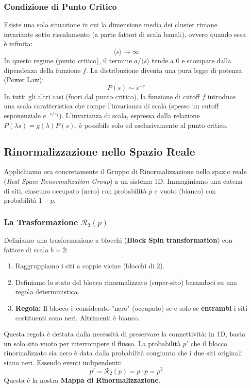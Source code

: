\subsubsection{Condizione di Punto Critico}
Esiste una sola situazione in cui la dimensione media dei cluster rimane invariante sotto riscalamento (a parte fattori di scala banali), ovvero quando essa è infinita:
\begin{equation}
    \langle s \rangle \to \infty
\end{equation}
In questo regime (punto critico), il termine $a/\langle s \rangle$ tende a 0 e scompare dalla dipendenza della funzione $f$. La distribuzione diventa una pura legge di potenza (Power Law):
\begin{equation}
    P(s) \sim s^{-\tau}
\end{equation}
In tutti gli altri casi (fuori dal punto critico), la funzione di cutoff $f$ introduce una scala caratteristica che rompe l'invarianza di scala (spesso un cutoff esponenziale $e^{-s/s_{\xi}}$).
L'invarianza di scala, espressa dalla relazione $P(\lambda s) = g(\lambda) P(s)$, è possibile solo ed esclusivamente al punto critico.

\subsection{Rinormalizzazione nello Spazio Reale}

Applichiamo ora concretamente il Gruppo di Rinormalizzazione nello spazio reale (\textit{Real Space Renormalization Group}) a un sistema 1D.
Immaginiamo una catena di siti, ciascuno occupato (nero) con probabilità $p$ e vuoto (bianco) con probabilità $1-p$.

\subsubsection{La Trasformazione $\mathcal{R}_2(p)$}
Definiamo una trasformazione a blocchi (\textbf{Block Spin transformation}) con fattore di scala $b=2$:
\begin{enumerate}
    \item Raggruppiamo i siti a coppie vicine (blocchi di 2).
    \item Definiamo lo stato del blocco rinormalizzato (super-sito) basandoci su una regola deterministica.
    \item \textbf{Regola:} Il blocco è considerato "nero" (occupato) se e solo se \textbf{entrambi} i siti costituenti sono neri. Altrimenti è bianco.
\end{enumerate}
Questa regola è dettata dalla necessità di preservare la connettività: in 1D, basta un solo sito vuoto per interrompere il flusso.
La probabilità $p'$ che il blocco rinormalizzato sia nero è data dalla probabilità congiunta che i due siti originali siano neri. Essendo eventi indipendenti:
\begin{equation}
    p' = \mathcal{R}_2(p) = p \cdot p = p^2
\end{equation}
Questa è la nostra \textbf{Mappa di Rinormalizzazione}.

